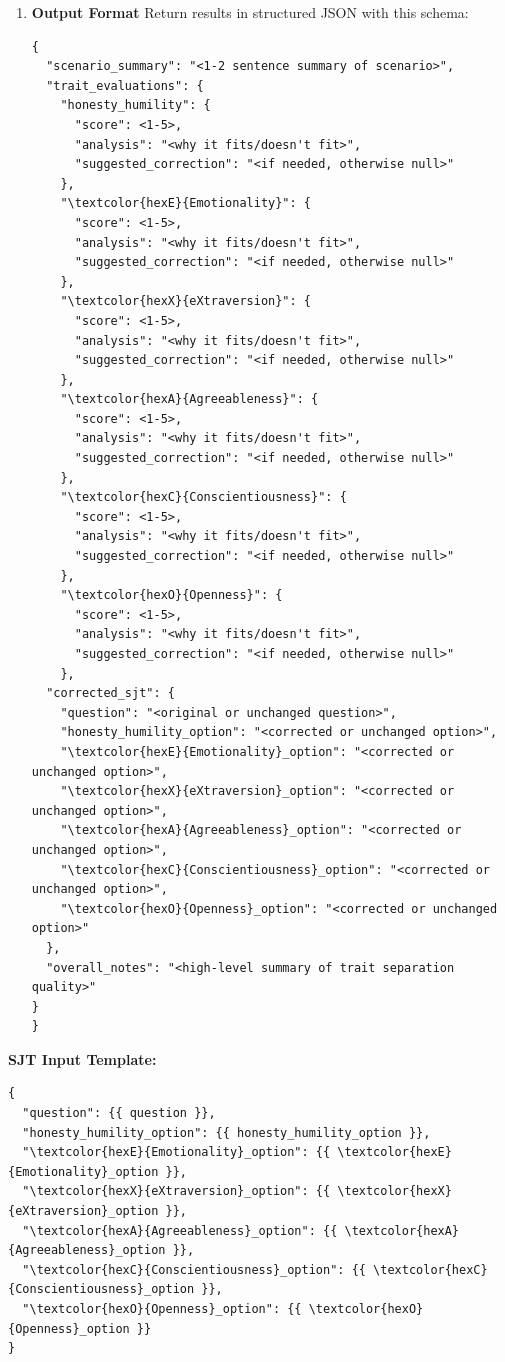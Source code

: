 \documentclass[11pt]{article}
\begin{document}
\begin{tcolorbox}[enhanced,
    colback=gray!5,
    colframe=black!75,
    fonttitle=\bfseries,
    title={SJT Trait Bleed Evaluation Prompt},
    breakable,
    boxrule=0.6pt
]
\begin{enumerate}
    \item \textbf{Output Format}  
    Return results in structured JSON with this schema:
\begin{verbatim}
{
  "scenario_summary": "<1-2 sentence summary of scenario>",
  "trait_evaluations": {
    "honesty_humility": {
      "score": <1-5>,
      "analysis": "<why it fits/doesn't fit>",
      "suggested_correction": "<if needed, otherwise null>"
    },
    "\textcolor{hexE}{Emotionality}": {
      "score": <1-5>,
      "analysis": "<why it fits/doesn't fit>",
      "suggested_correction": "<if needed, otherwise null>"
    },
    "\textcolor{hexX}{eXtraversion}": {
      "score": <1-5>,
      "analysis": "<why it fits/doesn't fit>",
      "suggested_correction": "<if needed, otherwise null>"
    },
    "\textcolor{hexA}{Agreeableness}": {
      "score": <1-5>,
      "analysis": "<why it fits/doesn't fit>",
      "suggested_correction": "<if needed, otherwise null>"
    },
    "\textcolor{hexC}{Conscientiousness}": {
      "score": <1-5>,
      "analysis": "<why it fits/doesn't fit>",
      "suggested_correction": "<if needed, otherwise null>"
    },
    "\textcolor{hexO}{Openness}": {
      "score": <1-5>,
      "analysis": "<why it fits/doesn't fit>",
      "suggested_correction": "<if needed, otherwise null>"
    },
  "corrected_sjt": {
    "question": "<original or unchanged question>",
    "honesty_humility_option": "<corrected or unchanged option>",
    "\textcolor{hexE}{Emotionality}_option": "<corrected or unchanged option>",
    "\textcolor{hexX}{eXtraversion}_option": "<corrected or unchanged option>",
    "\textcolor{hexA}{Agreeableness}_option": "<corrected or unchanged option>",
    "\textcolor{hexC}{Conscientiousness}_option": "<corrected or unchanged option>",
    "\textcolor{hexO}{Openness}_option": "<corrected or unchanged option>"
  },
  "overall_notes": "<high-level summary of trait separation quality>"
}
}
\end{verbatim}
\end{enumerate}

\medskip
\textbf{SJT Input Template:}
\begin{verbatim}
{
  "question": {{ question }},
  "honesty_humility_option": {{ honesty_humility_option }},
  "\textcolor{hexE}{Emotionality}_option": {{ \textcolor{hexE}{Emotionality}_option }},
  "\textcolor{hexX}{eXtraversion}_option": {{ \textcolor{hexX}{eXtraversion}_option }},
  "\textcolor{hexA}{Agreeableness}_option": {{ \textcolor{hexA}{Agreeableness}_option }},
  "\textcolor{hexC}{Conscientiousness}_option": {{ \textcolor{hexC}{Conscientiousness}_option }},
  "\textcolor{hexO}{Openness}_option": {{ \textcolor{hexO}{Openness}_option }}
}
\end{verbatim}
\end{tcolorbox}
\end{document}
